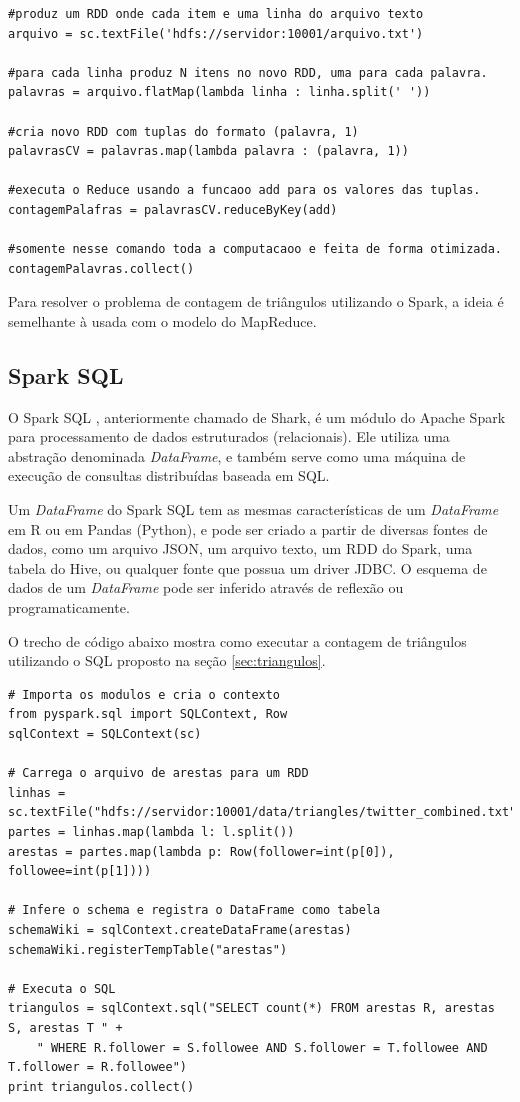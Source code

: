 \begin{lstlisting}[style=MyPythonStyle]
#produz um RDD onde cada item e uma linha do arquivo texto
arquivo = sc.textFile('hdfs://servidor:10001/arquivo.txt') 

#para cada linha produz N itens no novo RDD, uma para cada palavra.
palavras = arquivo.flatMap(lambda linha : linha.split(' ')) 

#cria novo RDD com tuplas do formato (palavra, 1)
palavrasCV = palavras.map(lambda palavra : (palavra, 1)) 

#executa o Reduce usando a funcaoo add para os valores das tuplas.
contagemPalafras = palavrasCV.reduceByKey(add) 

#somente nesse comando toda a computacaoo e feita de forma otimizada.
contagemPalavras.collect() 
\end{lstlisting}

Para resolver o problema de contagem de triângulos utilizando o Spark, a ideia é semelhante à usada com 
o modelo do MapReduce.

\subsection{Spark SQL}
O Spark SQL \cite{xin2013shark, armbrust2015spark}, anteriormente chamado de Shark, é um módulo do Apache 
Spark para processamento de dados estruturados (relacionais). Ele utiliza uma abstração denominada 
\emph{DataFrame}, e também serve como uma máquina de execução de consultas distribuídas baseada em SQL. 

Um \emph{DataFrame} do Spark SQL tem as mesmas características de um \emph{DataFrame} em R ou em 
Pandas (Python), e pode ser criado a partir de diversas fontes de dados, como um arquivo JSON, um 
arquivo texto, um RDD do Spark, uma tabela do Hive, ou qualquer fonte que possua um driver JDBC. 
O esquema de dados de um \emph{DataFrame} pode ser inferido através de reflexão ou programaticamente. 

O trecho de código abaixo mostra como executar a contagem de triângulos utilizando o SQL proposto na 
seção \ref{sec:triangulos}.

\begin{lstlisting}[style=MyPythonStyle]
# Importa os modulos e cria o contexto
from pyspark.sql import SQLContext, Row
sqlContext = SQLContext(sc)

# Carrega o arquivo de arestas para um RDD
linhas = sc.textFile("hdfs://servidor:10001/data/triangles/twitter_combined.txt")
partes = linhas.map(lambda l: l.split())
arestas = partes.map(lambda p: Row(follower=int(p[0]), followee=int(p[1])))

# Infere o schema e registra o DataFrame como tabela
schemaWiki = sqlContext.createDataFrame(arestas)
schemaWiki.registerTempTable("arestas")

# Executa o SQL
triangulos = sqlContext.sql("SELECT count(*) FROM arestas R, arestas S, arestas T " +
    " WHERE R.follower = S.followee AND S.follower = T.followee AND T.follower = R.followee")
print triangulos.collect()
\end{lstlisting}


